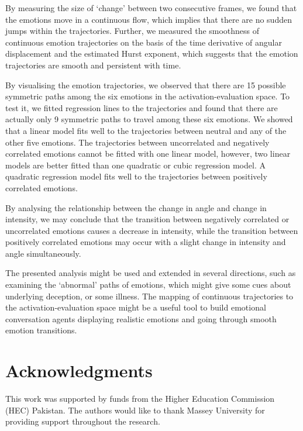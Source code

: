 \documentclass[10pt,journal,cspaper,compsoc]{IEEEtran}
\begin{document}
By measuring the size of `change' between two consecutive frames, we found that the emotions move in a continuous flow, which implies that there are no sudden jumps within the trajectories. Further, we measured the smoothness of continuous emotion trajectories on the basis of the time derivative of angular displacement and the estimated Hurst exponent, which suggests that the emotion trajectories are smooth and persistent with time.

By visualising the emotion trajectories, we observed that there are 15 possible symmetric paths among the six emotions in the activation-evaluation space. To test it, we fitted regression lines to the trajectories and found that there are actually only 9 symmetric paths to travel among these six emotions. We showed that a linear model fits well to the trajectories between neutral and any of the other five emotions. The trajectories between uncorrelated and negatively correlated emotions cannot be fitted with one linear model, however, two linear models are better fitted than one quadratic or cubic regression model. A quadratic regression model fits well to the trajectories between positively correlated emotions. 

By analysing the relationship between the change in angle and change in intensity, we may conclude that the transition between negatively correlated or uncorrelated emotions causes a decrease in intensity, while the transition between positively correlated emotions may occur with a slight change in intensity and angle simultaneously. 

The presented analysis might be used and extended in several directions, such as examining the `abnormal' paths of emotions, which might give some cues about underlying deception, or some illness. The mapping of continuous trajectories to the activation-evaluation space might be a useful tool to build emotional conversation agents displaying realistic emotions and going through smooth emotion transitions.

\section*{Acknowledgments}
This work was supported by funds from the Higher Education Commission (HEC) Pakistan. The authors would like to thank Massey University for providing support throughout the research.

\end{document}
